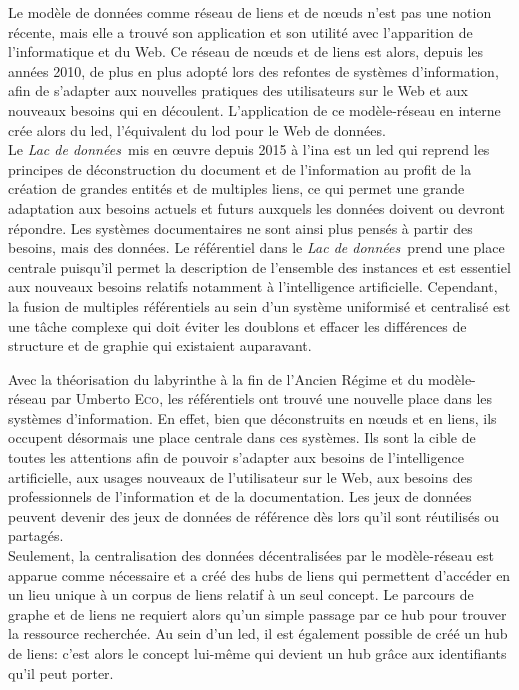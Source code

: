 \documentclass[a4paper,12pt,twoside]{book}
\newcommand{\ldd}{\textit{Lac de données~}}
\newcommand{\nP}[2]{#1 \textsc{#2}}
\begin{document}
	Le modèle de données comme réseau de liens et de nœuds n'est pas une notion récente, mais elle a trouvé son application et son utilité avec l'apparition de l'informatique et du Web. Ce réseau de nœuds et de liens est alors, depuis les années 2010, de plus en plus adopté lors des refontes de systèmes d'information, afin de s'adapter aux nouvelles pratiques des utilisateurs sur le Web et aux nouveaux besoins qui en découlent. L'application de ce modèle-réseau en interne crée alors du \ac{led}, l'équivalent du \ac{lod} pour le Web de données.\\
	
	Le \ldd mis en œuvre depuis 2015 à l'\ac{ina} est un \ac{led} qui reprend les principes de déconstruction du document et de l'information au profit de la création de grandes entités et de multiples liens, ce qui permet une grande adaptation aux besoins actuels et futurs auxquels les données doivent ou devront répondre. Les systèmes documentaires ne sont ainsi plus pensés à partir des besoins, mais des données. Le référentiel dans le \ldd prend une place centrale puisqu'il permet la description de l'ensemble des instances et est essentiel aux nouveaux besoins relatifs notamment à l'intelligence artificielle. Cependant, la fusion de multiples référentiels au sein d'un système uniformisé et centralisé est une tâche complexe qui doit éviter les doublons et effacer les différences de structure et de graphie qui existaient auparavant.
	
	
	
	
	
	\newpage
	
	Avec la théorisation du labyrinthe à la fin de l'Ancien Régime et du modèle-réseau par \nP{Umberto}{Eco}, les référentiels ont trouvé une nouvelle place dans les systèmes d'information. En effet, bien que déconstruits en nœuds et en liens, ils occupent désormais une place centrale dans ces systèmes. Ils sont la cible de toutes les attentions afin de pouvoir s'adapter aux besoins de l'intelligence artificielle, aux usages nouveaux de l'utilisateur sur le Web, aux besoins des professionnels de l'information et de la documentation. Les jeux de données peuvent devenir des jeux de données de référence dès lors qu'il sont réutilisés ou partagés.\\
	
	Seulement, la centralisation des données décentralisées par le modèle-réseau est apparue comme nécessaire et a créé des hubs de liens qui permettent d'accéder en un lieu unique à un corpus de liens relatif à un seul concept. Le parcours de graphe et de liens ne requiert alors qu'un simple passage par ce hub pour trouver la ressource recherchée. Au sein d'un \ac{led}, il est également possible de créé un hub de liens: c'est alors le concept lui-même qui devient un hub grâce aux identifiants qu'il peut porter.\\
	
\end{document}
